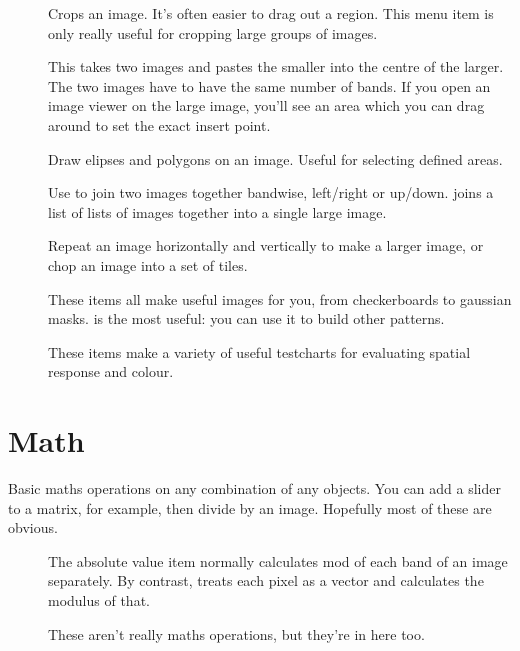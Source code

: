 \begin{description}
\item[]
	Crops an image. It's often easier to drag out a region. This menu item
	is only really useful for cropping large groups of images.

\item[]
	This takes two images and pastes the smaller into the centre of the
	larger. The two images have to have the same number of bands.
	If you open an image viewer on the large image, you'll see an area
	which you can drag around to set the exact insert point.

\item[]
	Draw elipses and polygons on an image. Useful for selecting defined
	areas.

\item[]
	Use to join two images together bandwise, left/right or up/down.
	 joins a list of lists of images together into a single
	large image.

\item[]
	Repeat an image horizontally and vertically to make a larger image, or
	chop an image into a set of tiles.

\item[]
	These items all make useful images for you, from checkerboards to
	gaussian masks.  is the most useful: you can use it to
	build other patterns.

\item[]
	These items make a variety of useful testcharts for evaluating
	spatial response and colour.

\end{description}

\section{Math}

Basic maths operations on any combination of any objects. You can add a slider
to a matrix, for example, then divide by an image. Hopefully most of these 
are obvious.

\begin{description}

\item[]
	The absolute value item normally calculates mod of each band of an
	image separately. By contrast,  treats
	each pixel as a vector and calculates the modulus of that.

\item[]
	These aren't really maths operations, but they're in here too.

\end{description}

